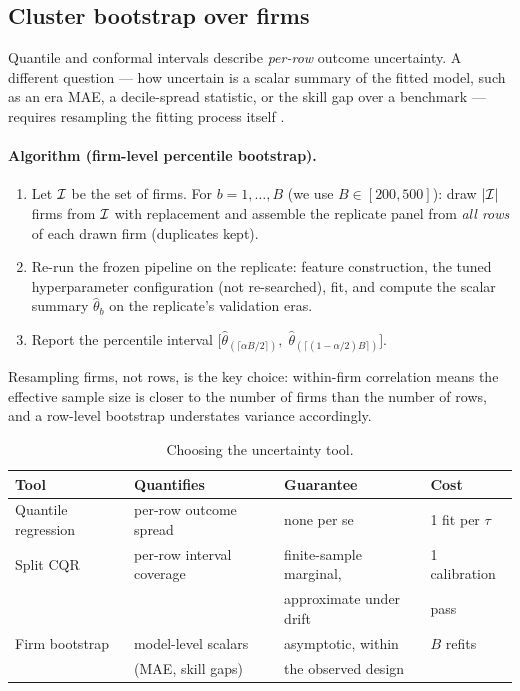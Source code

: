 \subsection{Cluster bootstrap over firms}

Quantile and conformal intervals describe \emph{per-row} outcome uncertainty. A different
question --- how uncertain is a scalar summary of the fitted model, such as an era MAE, a
decile-spread statistic, or the skill gap over a benchmark --- requires resampling the fitting
process itself \citep{efron1994}.

\paragraph{Algorithm (firm-level percentile bootstrap).}
\begin{enumerate}
\item Let $\mathcal{I}$ be the set of firms. For $b = 1, \dots, B$ (we use $B \in [200, 500]$): draw
$\left|\mathcal{I}\right|$ firms from $\mathcal{I}$ with replacement and assemble the replicate panel from
\emph{all rows} of each drawn firm (duplicates kept).
\item Re-run the frozen pipeline on the replicate: feature construction, the tuned
hyperparameter configuration (not re-searched), fit, and compute the scalar summary
$\hat\theta_b$ on the replicate's validation eras.
\item Report the percentile interval $\bigl[\hat\theta_{(\lceil \alpha B/2 \rceil)},\;
\hat\theta_{(\lceil (1-\alpha/2) B \rceil)}\bigr]$.
\end{enumerate}
Resampling firms, not rows, is the key choice: within-firm correlation means the effective
sample size is closer to the number of firms than the number of rows, and a row-level bootstrap
understates variance accordingly.

\begin{table}[htbp]
\centering
\caption{Choosing the uncertainty tool.}
\label{cheu:tab:uqtools}
\begin{tabular}{@{}llll@{}}
\toprule
Tool & Quantifies & Guarantee & Cost \\
\midrule
Quantile regression & per-row outcome spread & none per se & 1 fit per
$\tau$ \\
Split CQR & per-row interval coverage & finite-sample marginal, & 1
calibration \\
 & & approximate under drift & pass \\
Firm bootstrap & model-level scalars & asymptotic, within & $B$
refits \\
 & (MAE, skill gaps) & the observed design & \\
\bottomrule
\end{tabular}
\end{table}


